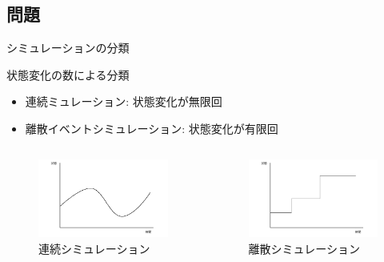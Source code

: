 \documentclass[dvipdfmx,uplatex,11pt]{beamer}
\theoremstyle{definition}
\begin{document}
\subsection{問題}
\begin{frame}{シミュレーションの分類}
  \begin{block}{状態変化の数による分類}

    \begin{itemize}
      \item 連続ミュレーション:  状態変化が無限回
      \item 離散イベントシミュレーション:  状態変化が有限回
    \end{itemize}
  \end{block}

  \begin{columns}
  
    \begin{column}{0.5\textwidth}
      
      \begin{figure}[htb]
        \centering
        \includegraphics[scale=0.3]{continuous_sim.png}
        \caption{ \small 連続シミュレーション}
      \end{figure}
    \end{column}

    \begin{column}{0.5\textwidth}
      
      \begin{figure}[htb]
        \centering
      \includegraphics[scale=0.3]{discrete_sim.png}
        \caption{\small 離散シミュレーション}
      \end{figure}
    \end{column}
  

\end{columns}
\end{frame}
\end{document}
